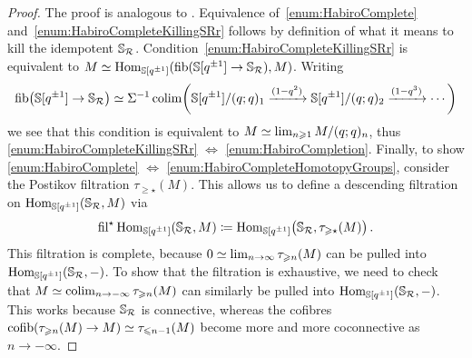 \documentclass[DIV=12,numbers=enddot,leqno,bibliography=totoc]{scrartcl}
\begin{document}
	\begin{proof}
		The proof is analogous to \cite[]{Stacks}. Equivalence of~\cref{enum:HabiroComplete} and~\cref{enum:HabiroCompleteKillingSRr} follows by definition of what it means to kill the idempotent $\mathbb{S}_{\mathcal{R}}$. Condition~\cref{enum:HabiroCompleteKillingSRr} is equivalent to $M\simeq \operatorname{Hom}_{\mathbb{S}[q^{\pm 1}]}(\operatorname{fib}(\mathbb{S}[q^{\pm 1}]\rightarrow \mathbb{S}_{\mathcal{R}}),M)$. Writing
		\begin{equation*}
			\fib\bigl(\IS[q^{\pm 1}]\rightarrow \IS_\Rr\bigr)\simeq \Sigma^{-1}\colimit\left(\IS[q^{\pm 1}]/(q;q)_1\xrightarrow{(1-q^2)}\IS[q^{\pm 1}]/(q;q)_2\xrightarrow{(1-q^3)}\dotsb\right)
		\end{equation*}
		we see that this condition is equivalent to $M\simeq \operatorname*{lim}_{n\geqslant 1}M/(q;q)_n$, thus \cref{enum:HabiroCompleteKillingSRr} $\Leftrightarrow$ \cref{enum:HabiroCompletion}. Finally, to show \cref{enum:HabiroComplete} $\Leftrightarrow$ \cref{enum:HabiroCompleteHomotopyGroups}, consider the Postikov filtration $\tau_{\geqslant \star}(M)$. This allows us to define a descending filtration on $\operatorname{Hom}_{\mathbb{S}[q^{\pm 1}]}(\mathbb{S}_{\mathcal{R}},M)$ via
		\begin{equation*}
			\fil^\star \Hom_{\IS[q^{\pm 1}]}(\IS_\Rr,M)\coloneqq \Hom_{\IS[q^{\pm 1}]}\bigl(\IS_\Rr,\tau_{\geqslant \star}(M)\bigr)\,.
		\end{equation*}
		This filtration is complete, because $0\simeq \operatorname*{lim}_{n\rightarrow \infty}\tau_{\geqslant n}(M)$ can be pulled into $\operatorname{Hom}_{\mathbb{S}[q^{\pm 1}]}(\mathbb{S}_{\mathcal{R}},-)$. To show that the filtration is exhaustive, we need to check that $M\simeq \operatorname*{colim}_{n\rightarrow -\infty}\tau_{\geqslant n}(M)$  can similarly be pulled into $\operatorname{Hom}_{\mathbb{S}[q^{\pm 1}]}(\mathbb{S}_{\mathcal{R}},-)$. This works because $\mathbb{S}_{\mathcal{R}}$ is connective, whereas the cofibres $\operatorname{cofib}(\tau_{\geqslant n}(M)\rightarrow M)\simeq \tau_{\leqslant n-1}(M)$ become more and more coconnective as $n\rightarrow -\infty$.
		

\end{proof}
\end{document}
